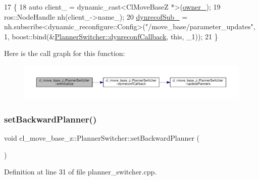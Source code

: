 \begin{DoxyCode}
17 \{
18   \textcolor{keyword}{auto} client\_ = \textcolor{keyword}{dynamic\_cast<}ClMoveBaseZ *\textcolor{keyword}{>}(\hyperlink{classsmacc_1_1ISmaccComponent_a909590e672450ce0eb0d8facb45c737a}{owner\_});
19   ros::NodeHandle nh(client\_->name\_);
20   \hyperlink{classcl__move__base__z_1_1PlannerSwitcher_ae902346f4f8e58241acc56cccaad8546}{dynrecofSub\_} = nh.subscribe<dynamic\_reconfigure::Config>(\textcolor{stringliteral}{"/move\_base/parameter\_updates"}, 1, 
      boost::bind(&\hyperlink{classcl__move__base__z_1_1PlannerSwitcher_ad9371bd8d62600ef874e8914c3ec177b}{PlannerSwitcher::dynreconfCallback}, \textcolor{keyword}{this}, \_1));
21 \}
\end{DoxyCode}
Here is the call graph for this function\+:
\nopagebreak
\begin{figure}[H]
\begin{center}
\leavevmode
\includegraphics[width=350pt]{classcl__move__base__z_1_1PlannerSwitcher_a36bc2b9788f03a1ca02b954c625ef4c5_cgraph}
\end{center}
\end{figure}
\mbox{\label{classcl__move__base__z_1_1PlannerSwitcher_a6995deff44418a0965e4e793de8c4857}} 
\subsubsection{\texorpdfstring{set\+Backward\+Planner()}{setBackwardPlanner()}}
{\footnotesize\ttfamily void cl\+\_\+move\+\_\+base\+\_\+z\+::\+Planner\+Switcher\+::set\+Backward\+Planner (\begin{DoxyParamCaption}{ }\end{DoxyParamCaption})}



Definition at line 31 of file planner\+\_\+switcher.\+cpp.



